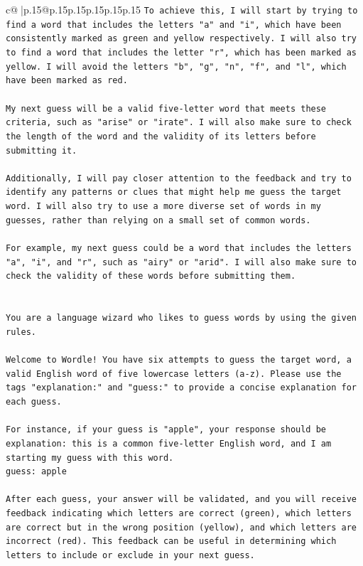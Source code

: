 \documentclass{article}
\begin{document}
{\begin{supertabular}{c@{$\;$}|p{.15\linewidth}@{}p{.15\linewidth}p{.15\linewidth}p{.15\linewidth}p{.15\linewidth}p{.15\linewidth}}
{{{\texttt{To achieve this, I will start by trying to find a word that includes the letters "a" and "i", which have been consistently marked as green and yellow respectively. I will also try to find a word that includes the letter "r", which has been marked as yellow. I will avoid the letters "b", "g", "n", "f", and "l", which have been marked as red.} \\
\\ 
\texttt{My next guess will be a valid five{-}letter word that meets these criteria, such as "arise" or "irate". I will also make sure to check the length of the word and the validity of its letters before submitting it.} \\
\\ 
\texttt{Additionally, I will pay closer attention to the feedback and try to identify any patterns or clues that might help me guess the target word. I will also try to use a more diverse set of words in my guesses, rather than relying on a small set of common words.} \\
\\ 
\texttt{For example, my next guess could be a word that includes the letters "a", "i", and "r", such as "airy" or "arid". I will also make sure to check the validity of these words before submitting them.} \\
\\ 
\\ 
\texttt{You are a language wizard who likes to guess words by using the given rules.} \\
\\ 
\texttt{Welcome to Wordle! You have six attempts to guess the target word, a valid English word of five lowercase letters (a{-}z). Please use the tags "explanation:" and "guess:" to provide a concise explanation for each guess.} \\
\\ 
\texttt{For instance, if your guess is "apple", your response should be} \\
\texttt{explanation: this is a common five{-}letter English word, and I am starting my guess with this word.} \\
\texttt{guess: apple} \\
\\ 
\texttt{After each guess, your answer will be validated, and you will receive feedback indicating which letters are correct (green), which letters are correct but in the wrong position (yellow), and which letters are incorrect (red). This feedback can be useful in determining which letters to include or exclude in your next guess.} \\
}}}
\end{supertabular}}
\end{document}
